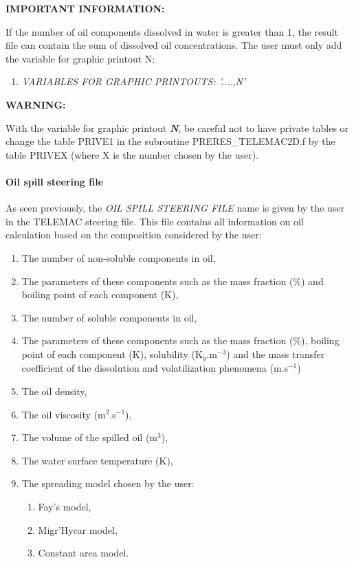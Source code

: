 \documentclass{article} %
\begin{document}
 \textbf{IMPORTANT INFORMATION:}

 If the number of oil components dissolved in water is greater than 1, the result file can contain the sum of dissolved oil concentrations. The user must only add the variable for graphic printout N:

\begin{enumerate}
\item  \textit{VARIABLES FOR GRAPHIC PRINTOUTS: '....,N'}
\end{enumerate}

 \textbf{WARNING:}

 With the variable for graphic printout \textbf{\textit{N}}, be careful not to have private tables or change the table PRIVE1 in the subroutine PRERES\_TELEMAC2D.f by the table PRIVEX (where X is the number chosen by the user).


\paragraph{ Oil spill steering file}

 As seen previously, the \textit{OIL SPILL STEERING FILE }name is given by the user in the TELEMAC steering file. This file contains all information on oil calculation based on the composition considered by the user:

\begin{enumerate}
\item  The number of non-soluble components in oil,

\item  The parameters of these components such as the mass fraction (\%) and boiling point of each component (K),

\item  The number of soluble components in oil,

\item  The parameters of these components such as the mass fraction (\%), boiling point of each component (K), solubility (K${}_{g}$.m${}^{-3}$) and the mass transfer coefficient of the dissolution and volatilization phenomena (m.s${}^{-1}$)

\item  The oil density,

\item  The oil viscosity (m${}^{2}$.s${}^{-1}$),

\item  The volume of the spilled oil (m${}^{3}$),

\item  The water surface temperature (K),

\item  The spreading model chosen by the user:

\begin{enumerate}
\item  Fay's model,

\item  Migr'Hycar model,

\item  Constant area model.
\end{enumerate}
\end{enumerate}
\end{document}
